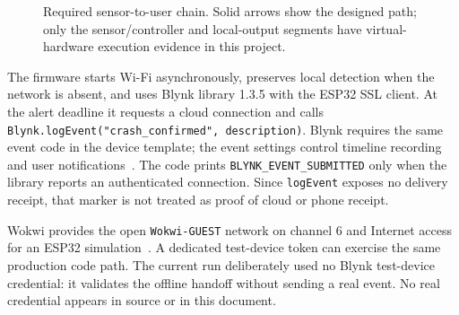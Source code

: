 \documentclass[12pt,a4paper]{article}
\begin{document}
\begin{figure}[H]
\centering
{}
\caption{Required sensor-to-user chain. Solid arrows show the designed path;
only the sensor/controller and local-output segments have virtual-hardware
execution evidence in this project.}
\label{fig:iotchain}
\end{figure}

The firmware starts Wi-Fi asynchronously, preserves local detection when the
network is absent, and uses Blynk library 1.3.5 with the ESP32 SSL client. At
the alert deadline it requests a cloud connection and calls
\texttt{Blynk.logEvent("crash\_confirmed", description)}. Blynk requires the
same event code in the device template; the event settings control timeline
recording and user notifications~\cite{blynktemplate,blynkevents}. The code
prints \texttt{BLYNK\_EVENT\_SUBMITTED} only when the library reports an
authenticated connection. Since \texttt{logEvent} exposes no delivery
receipt, that marker is not treated as proof of cloud or phone receipt.

Wokwi provides the open \texttt{Wokwi-GUEST} network on channel 6 and Internet
access for an ESP32 simulation~\cite{wokwiwifi}. A dedicated test-device token
can exercise the same production code path. The current run deliberately used
no Blynk test-device credential: it validates the offline handoff without
sending a real event. No real credential appears in source or in this document.
\end{document}
